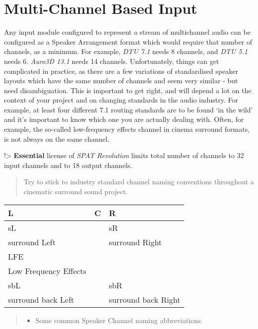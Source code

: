 \documentclass[
  letterpaper,
  DIV=11,
  numbers=noendperiod]{scrreport}
\providecommand{\tightlist}{%
  \setlength{\itemsep}{0pt}\setlength{\parskip}{0pt}}\usepackage{longtable,booktabs,array}
\begin{document}
\hypertarget{multi-channel-based-input}{%
\section{Multi-Channel Based Input}\label{multi-channel-based-input}}

Any input module configured to represent a stream of multichannel audio
can be configured as a Speaker Arrangement format which would require
that number of channels, as a minimum. For example, \emph{DTU 7.1} needs
8 channels, and \emph{DTU 5.1} needs 6. \emph{Auro3D 13.1} needs 14
channels. Unfortunately, things can get complicated in practice, as
there are a few variations of standardised speaker layouts which have
the same number of channels and seem very similar - but need
disambiguation. This is important to get right, and will depend a lot on
the context of your project and on changing standards in the audio
industry. For example, at least four different 7.1 routing standards are
to be found `in the wild' and it's important to know which one you are
actually dealing with. Often, for example, the so-called low-frequency
effects channel in cinema surround formats, is not always on the same
channel.

!\textgreater{} \textbf{Essential} license of \emph{SPAT Revolution}
limits total number of channels to 32 input channels and to 18 output
channels.

\begin{quote}
Try to stick to industry standard channel naming conventions throughout
a cinematic surround sound project.
\end{quote}

\begin{longtable}[]{@{}lll@{}}
\toprule()
L & C & R \\
\midrule()
\endhead
sL & & sR \\
surround Left & & surround Right \\
LFE & & \\
Low Frequency Effects & & \\
sbL & & sbR \\
surround back Left & & surround back Right \\
\bottomrule()
\end{longtable}

\begin{quote}
\begin{itemize}
\tightlist
\item
  Some common Speaker Channel naming abbreviations.
\end{itemize}
\end{quote}
\end{document}
